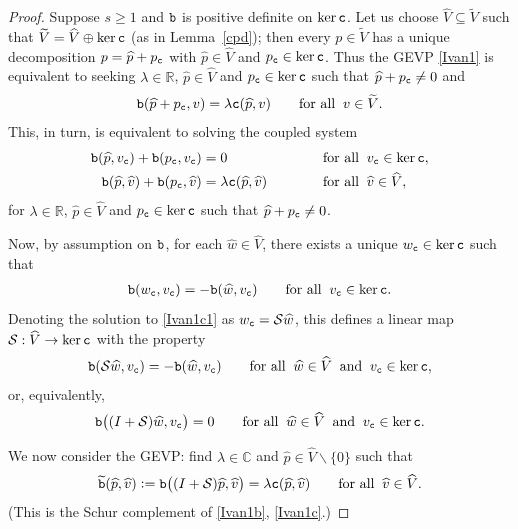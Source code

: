 \documentclass[numbers,webpdf,imaiai]{ima-authoring-template}%
\theoremstyle{thmstyletwo}%
\numberwithin{equation}{section}
\newcommand{\scS}{\mathcal{S}}
\newcommand{\txtb}{\textup{\texttt{b}}}
\newcommand{\txtc}{\textup{\texttt{c}}}
\newcommand{\wV}{\widetilde{V}}
\newcommand{\whV}{\widehat{V}}
\newcommand{\whv}{\widehat{v}}
\newcommand{\whw}{\widehat{w}}
\newcommand{\whp}{\widehat{p}}
\newcommand{\assign}{\mathrel{\mathop:}=}
\numberwithin{equation}{section}
\begin{document}
{\begin{proof}
Suppose $s \ge 1$ and $\txtb$ is positive definite on $\ker \txtc$. 
Let us choose $\whV\subseteq\wV$ such that $\wV = \whV\oplus \ker \txtc$ (as in Lemma~\ref{cpd});
then every $p \in \wV$ has a unique decomposition $p = \whp + p_{\txtc} $ with $\whp\in \whV$ and  $p_{\txtc}\in \ker \txtc$. 
Thus the GEVP \eqref{Ivan1} is equivalent to seeking $\lambda \in \mathbb{R}$, $\whp \in \whV$ and  $p_{\txtc} \in \ker \txtc$ such
that $\whp + p_{\txtc} \ne 0$ and  
\begin{align} \label{Ivan1a} 
	\txtb(\whp + p_{\txtc}, v ) = \lambda \txtc (\whp, v) \qquad \text{for all} \;\; v \in \wV.
\end{align}
This, in turn, is equivalent to solving  the coupled system
\begin{alignat}{2}
	\txtb(\whp, v_\txtc) + \txtb(p_{\txtc}, v_{\txtc})    &= 0 \qquad 
	&& \text{for all} \;\; v_{\txtc} \in \ker \txtc, 
	\label{Ivan1b}\\
	\txtb(\whp,\whv) + \txtb(p_{\txtc},\whv) &= \lambda \txtc (\whp,\whv) \qquad\quad 
	&& \text{for all} \;\; \whv \in \whV,
	\label{Ivan1c}
\end{alignat}
for $\lambda \in \mathbb{R}$,   $\whp\in \whV$ and $p_{\txtc} \in \ker \txtc$ such
that $ \whp + p_{\txtc} \ne 0$. 
    
Now, by assumption on  $\txtb$, for each $\whw \in \whV$, there exists a unique $w_\txtc \in \ker \txtc$ such that
\begin{align}\label{Ivan1c1} 
	\txtb(w_\txtc, v_\txtc) = - \txtb(\whw , v_\txtc) \qquad \text{for all} \;\; v_\txtc \in \ker \txtc. 
\end{align} 
Denoting the solution to \eqref{Ivan1c1} as $w_\txtc = \scS \whw$, this defines a  linear map
$\scS: \whV\rightarrow \ker \txtc$ with the property
\begin{align}\label{Ivan1b1}
	\txtb(\scS \whw, v_\txtc) = - \txtb(\whw, v_\txtc) \qquad \text{for all} \;\;
	\whw \in \whV \;\; \text{and} \;\; v_\txtc \in \ker \txtc,
\end{align}
or, equivalently,  
\begin{align} \label{Ivan1d} 
	\txtb\bigl((I + \scS) \whw, v_\txtc\bigr) = 0 \qquad \text{for all} \;\; \whw \in \whV \;\; \text{and} \;\; v_\txtc \in \ker \txtc.
\end{align} 

We now  consider the GEVP: find $\lambda \in \mathbb{C}$ and   $\whp \in \whV\backslash \{0\}$ such that
\begin{align} \label{Ivan1e} 
	\widetilde{\txtb} (\whp, \whv) \assign \txtb\bigl((I + \scS) \whp, \whv\bigr) = \lambda \txtc(\whp, \whv) \qquad 
	\text{for all} \;\; \whv \in \whV.  
\end{align}
(This is the Schur complement of \eqref{Ivan1b}, \eqref{Ivan1c}.)
    

\end{proof}}
\end{document}
